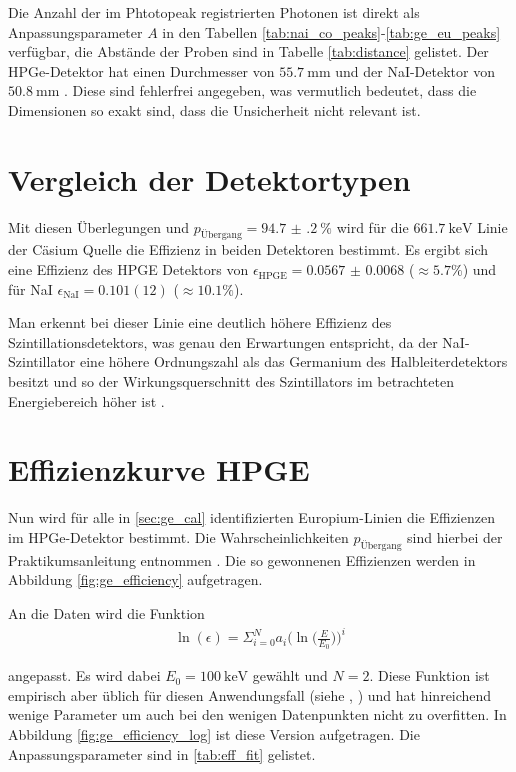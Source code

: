 Die Anzahl der im Phtotopeak registrierten Photonen ist direkt als Anpassungsparameter $A$ in den Tabellen \ref{tab:nai_co_peaks}-\ref{tab:ge_eu_peaks} verfügbar, die Abstände der Proben sind in Tabelle \ref{tab:distance} gelistet. Der HPGe-Detektor hat einen Durchmesser von $\SI{55.7}{\milli\meter}$ und der NaI-Detektor von $\SI{50.8}{\milli\meter}$ \cite[6]{521versuchsanleitung}. Diese sind fehlerfrei angegeben, was vermutlich bedeutet, dass die Dimensionen so exakt sind, dass die Unsicherheit nicht relevant ist.

\section{Vergleich der Detektortypen}
Mit diesen Überlegungen und $p_\text{Übergang} = \SI{94.7(2)}{\percent}$ \cite{521versuchsanleitung} wird für die $\SI{661.7}{\kilo\electronvolt}$ Linie der Cäsium Quelle die Effizienz in beiden Detektoren bestimmt.
Es ergibt sich eine Effizienz des HPGE Detektors von $\epsilon_\text{HPGE} = \num{0.0567(68)}$ ($\approx 5.7\%$) und für NaI $\epsilon_\text{NaI} = 0.101(12)$ ($\approx 10.1\%$).

Man erkennt bei dieser Linie eine deutlich höhere Effizienz des Szintillationsdetektors, was genau den Erwartungen entspricht, da der NaI-Szintillator eine höhere Ordnungszahl als das Germanium des Halbleiterdetektors besitzt und so der Wirkungsquerschnitt des Szintillators im betrachteten Energiebereich höher ist \cite[561,571]{gammahandbook}.


\section{Effizienzkurve HPGE}

Nun wird für alle in \ref{sec:ge_cal} identifizierten Europium-Linien die Effizienzen im HPGe-Detektor bestimmt. Die Wahrscheinlichkeiten $p_\text{Übergang}$ sind hierbei der Praktikumsanleitung entnommen \cite[8]{521versuchsanleitung}.
Die so gewonnenen Effizienzen werden in Abbildung \ref{fig:ge_efficiency} aufgetragen.

An die Daten wird die Funktion
\begin{align}
	\ln(\epsilon) = \Sigma_{i=0}^N a_i \bigg(\ln \bigg( \frac{E}{E_0} \bigg) \bigg)^i \label{eq:fuckthis}
\end{align}

angepasst. Es wird dabei $E_0 = \SI{100}{\kilo\electronvolt}$ gewählt und $N=2$. Diese Funktion ist empirisch aber üblich für diesen Anwendungsfall (siehe \cite{bestpracticeefficiency}, \cite{characteristicefficiencyfunction}) und hat hinreichend wenige Parameter um auch bei den wenigen Datenpunkten nicht zu overfitten. In Abbildung \ref{fig:ge_efficiency_log} ist diese Version aufgetragen. Die Anpassungsparameter sind in \ref{tab:eff_fit} gelistet.

